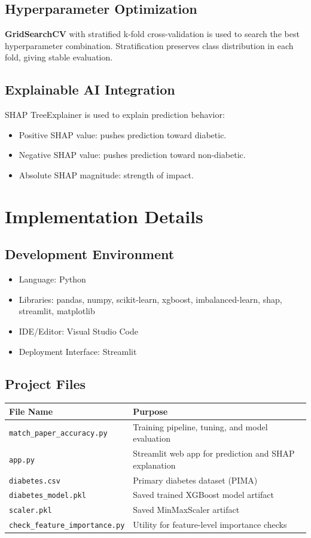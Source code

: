 \documentclass[12pt,a4paper]{report}
\begin{document}
\section{Hyperparameter Optimization}
\textbf{GridSearchCV} with stratified k-fold cross-validation is used to search the best hyperparameter combination. Stratification preserves class distribution in each fold, giving stable evaluation.

\section{Explainable AI Integration}
SHAP TreeExplainer is used to explain prediction behavior:
\begin{itemize}[leftmargin=1.2cm]
    \item Positive SHAP value: pushes prediction toward diabetic.
    \item Negative SHAP value: pushes prediction toward non-diabetic.
    \item Absolute SHAP magnitude: strength of impact.
\end{itemize}

\chapter{Implementation Details}

\section{Development Environment}
\begin{itemize}[leftmargin=1.2cm]
    \item Language: Python
    \item Libraries: pandas, numpy, scikit-learn, xgboost, imbalanced-learn, shap, streamlit, matplotlib
    \item IDE/Editor: Visual Studio Code
    \item Deployment Interface: Streamlit
\end{itemize}

\section{Project Files}
\begin{longtable}{p{} p{}}
\toprule
\textbf{File Name} & \textbf{Purpose} \\
\midrule
\endhead
\texttt{match\_paper\_accuracy.py} & Training pipeline, tuning, and model evaluation \\
\texttt{app.py} & Streamlit web app for prediction and SHAP explanation \\
\texttt{diabetes.csv} & Primary diabetes dataset (PIMA) \\
\texttt{diabetes\_model.pkl} & Saved trained XGBoost model artifact \\
\texttt{scaler.pkl} & Saved MinMaxScaler artifact \\
\texttt{check\_feature\_importance.py} & Utility for feature-level importance checks \\
\bottomrule
\end{longtable}
\end{document}
